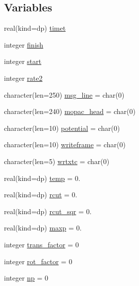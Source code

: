 \subsection*{Variables}
\begin{DoxyCompactItemize}
\item 
real(kind=dp) \hyperlink{namespacemod__input__read_a5ccab548b1c0f51bdd20cc9251e4dedb}{timet}
\item 
integer \hyperlink{namespacemod__input__read_af49668c97f27e5589794e545c5be5a22}{finish}
\item 
integer \hyperlink{namespacemod__input__read_a1fe425b57ec0b776789d69284fa29955}{start}
\item 
integer \hyperlink{namespacemod__input__read_a55525057629121499c3d3fb26c7bf282}{rate2}
\item 
character(len=250) \hyperlink{namespacemod__input__read_a2aa6f72008491094c0c96753d8d63d2e}{msg\+\_\+line} = char(0)
\item 
character(len=240) \hyperlink{namespacemod__input__read_a21db2c7c0ef283f45a6893ca2bf9a34a}{mopac\+\_\+head} = char(0)
\item 
character(len=10) \hyperlink{namespacemod__input__read_af992e8c0badb490ee9f1d75568de6372}{potential} = char(0)
\item 
character(len=10) \hyperlink{namespacemod__input__read_a7327a05a4121e6b530adab45fdaa5d19}{writeframe} = char(0)
\item 
character(len=5) \hyperlink{namespacemod__input__read_a27a1649717d0aa5463782f51c29102f4}{wrtxtc} = char(0)
\item 
real(kind=dp) \hyperlink{namespacemod__input__read_a41af319bbc9c366863fee70f87f590a0}{temp} = 0.
\item 
real(kind=dp) \hyperlink{namespacemod__input__read_ad16f7026be229b0b283174a293fe570e}{rcut} = 0.
\item 
real(kind=dp) \hyperlink{namespacemod__input__read_a4c4705d35961d02b4275f73e44077819}{rcut\+\_\+sqr} = 0.
\item 
real(kind=dp) \hyperlink{namespacemod__input__read_a52849ceaebc993cf06d473c80bdf92ac}{maxp} = 0.
\item 
integer \hyperlink{namespacemod__input__read_a0c42ae57c5b1cbe6dbbb2cf1691525ce}{trans\+\_\+factor} = 0
\item 
integer \hyperlink{namespacemod__input__read_a6fde65123947b8b3eaf114c2d96caaad}{rot\+\_\+factor} = 0
\item 
integer \hyperlink{namespacemod__input__read_a4f57e5d94eb06921bf584303b54c88f4}{np} = 0

\end{DoxyCompactItemize}
